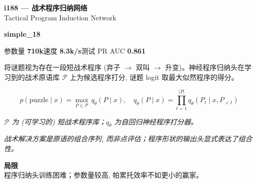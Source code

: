 \documentclass[10pt,a4paper]{article}
\newcommand{\pillsi}[0]{\colorbox{s18redbg}{\strut\textcolor{s18red}{\scriptsize\bfseries\sffamily simple\_18}}}
\begin{document}
\begin{tcolorbox}
\begin{tcolorbox}[archhead, boxsep=0pt, top=4pt, bottom=4pt]
\textcolor{deepforest}{\sffamily\bfseries\large i188 --- 战术程序归纳网络} \\[2pt]
{\color{muted}\small Tactical Program Induction Network}
\\[1pt]\textcolor{muted}{\sffamily\scriptsize \pillsi{}\quad 参数量 \textbf{710k}\quad 速度 \textbf{8.3k/s}\quad 测试 PR AUC \textbf{0.861}}
\end{tcolorbox}
\smallskip
将谜题视为存在一段短战术程序 (弃子 $\to$ 双叫 $\to$ 升变)。神经程序归纳头在学习到的战术原语库 $\mathcal{P}$ 上为候选程序打分, 谜题 logit 取最大似然程序的得分。
\par\smallskip
\begin{equation*}
p(\text{puzzle} \mid x) = \max_{P\in\mathcal{P}}\,q_\theta(P \mid x), \quad q_\theta(P \mid x) = \prod_{t=1}^{|P|} q_\theta(P_t \mid x, P_{<t})
\end{equation*}
\par\vspace{-4pt}\begin{center}\textit{\textcolor{muted}{\small $\mathcal{P}$ 为 (可学习的) 短战术程序库；$q_\theta$ 为自回归神经程序打分器。}}\end{center}
\par\smallskip{\color{forest}\sffamily\bfseries\textgreater\,}\textit{战术解决方案是\emph{原语的组合序列}, 而非点评估；程序形状的输出头显式表达了组合性。}
\par\smallskip\textbf{\sffamily\footnotesize\color{muted}局限}\\
程序归纳头训练困难；参数量较高, 帕累托效率不如更小的赢家。
\end{tcolorbox}
\end{document}
